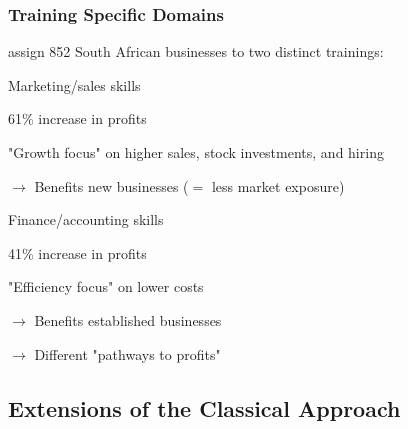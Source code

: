 \documentclass[hideothersubsections, usenames,dvipsnames,11pt]{beamer}
\newenvironment{itemize_2pt}{\itemize\addtolength{\itemsep}{2pt}}{\enditemize}
\newenvironment{enumerate_2pt}{\enumerate\addtolength{\itemsep}{2pt}}{\endenumerate}
\begin{document}
\begin{frame}
\frametitle{Training Specific Domains}

	\citet{Anderson2018} assign 852 South African businesses to two distinct trainings:
	\begin{enumerate_2pt}
	
		\item Marketing/sales skills
		\begin{itemize_2pt}
			\item 61\% increase in profits
			\item "Growth focus" on higher sales, stock investments, and hiring
			\item[] $\rightarrow$ Benefits new businesses ($=$ less market exposure)
		\end{itemize_2pt}		
		
		\item Finance/accounting skills
		
		\pause		
		
		\begin{itemize_2pt}
			\item 41\% increase in profits
			\item "Efficiency focus" on lower costs
			\item[] $\rightarrow$ Benefits established businesses
		\end{itemize_2pt}
		
		\item[] $\rightarrow$ Different "pathways to profits"
	
	\end{enumerate_2pt}

\end{frame}


\subsection{Extensions of the Classical Approach}
\end{document}
